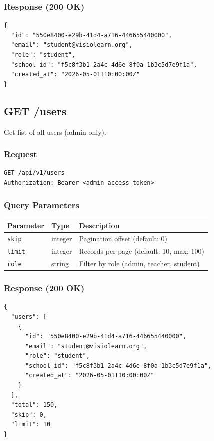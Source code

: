 \documentclass[12pt,a4paper,oneside]{article}
\begin{document}
\subsubsection{Response (200 OK)}

\begin{lstlisting}
{
  "id": "550e8400-e29b-41d4-a716-446655440000",
  "email": "student@visiolearn.org",
  "role": "student",
  "school_id": "f5c8f3b1-2a4c-4d6e-8f0a-1b3c5d7e9f1a",
  "created_at": "2026-05-01T10:00:00Z"
}
\end{lstlisting}

\subsection{GET /users}

Get list of all users (admin only).

\subsubsection{Request}

\begin{lstlisting}
GET /api/v1/users
Authorization: Bearer <admin_access_token>
\end{lstlisting}

\subsubsection{Query Parameters}

\begin{table}[H]
\centering
\small
\begin{tabular}{|l|l|l|}
\hline
\textbf{Parameter} & \textbf{Type} & \textbf{Description} \\
\hline
\texttt{skip} & integer & Pagination offset (default: 0) \\
\hline
\texttt{limit} & integer & Records per page (default: 10, max: 100) \\
\hline
\texttt{role} & string & Filter by role (admin, teacher, student) \\
\hline
\end{tabular}
\end{table}

\subsubsection{Response (200 OK)}

\begin{lstlisting}
{
  "users": [
    {
      "id": "550e8400-e29b-41d4-a716-446655440000",
      "email": "student@visiolearn.org",
      "role": "student",
      "school_id": "f5c8f3b1-2a4c-4d6e-8f0a-1b3c5d7e9f1a",
      "created_at": "2026-05-01T10:00:00Z"
    }
  ],
  "total": 150,
  "skip": 0,
  "limit": 10
}
\end{lstlisting}
\end{document}

